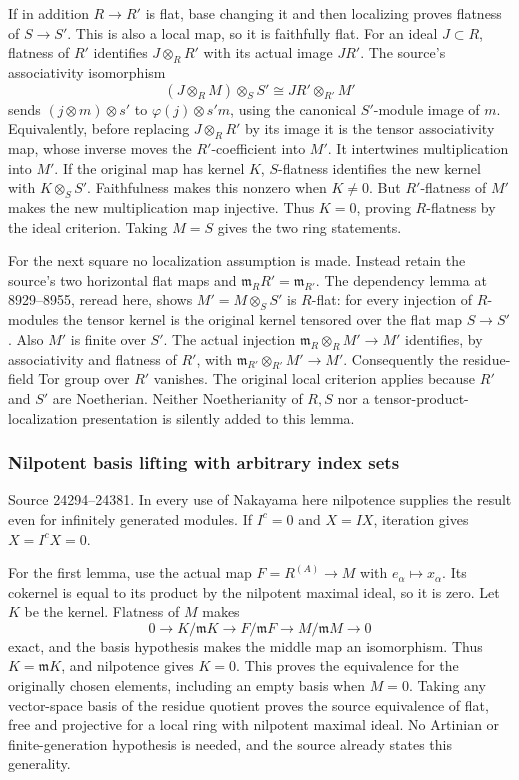 If in addition \(R\to R'\) is flat, base changing it and then localizing proves flatness of \(S\to S'\). This is also a local map, so it is faithfully flat. For an ideal \(J\subset R\), flatness of \(R'\) identifies \(J\otimes_RR'\) with its actual image \(JR'\). The source's associativity isomorphism \[
(J\otimes_RM)\otimes_SS'\cong JR'\otimes_{R'}M'
\] sends \((j\otimes m)\otimes s'\) to \(\varphi(j)\otimes s'm\), using the canonical \(S'\)-module image of \(m\). Equivalently, before replacing \(J\otimes_RR'\) by its image it is the tensor associativity map, whose inverse moves the \(R'\)-coefficient into \(M'\). It intertwines multiplication into \(M'\). If the original map has kernel \(K\), \(S\)-flatness identifies the new kernel with \(K\otimes_SS'\). Faithfulness makes this nonzero when \(K\ne0\). But \(R'\)-flatness of \(M'\) makes the new multiplication map injective. Thus \(K=0\), proving \(R\)-flatness by the ideal criterion. Taking \(M=S\) gives the two ring statements.

For the next square no localization assumption is made. Instead retain the source's two horizontal flat maps and \(\mathfrak m_RR'=\mathfrak m_{R'}\). The dependency lemma at 8929--8955, reread here, shows \(M'=M\otimes_SS'\) is \(R\)-flat: for every injection of \(R\)-modules the tensor kernel is the original kernel tensored over the flat map \(S\to S'\). Also \(M'\) is finite over \(S'\). The actual injection \(\mathfrak m_R\otimes_RM'\to M'\) identifies, by associativity and flatness of \(R'\), with \(\mathfrak m_{R'}\otimes_{R'}M'\to M'\). Consequently the residue-field Tor group over \(R'\) vanishes. The original local criterion applies because \(R'\) and \(S'\) are Noetherian. Neither Noetherianity of \(R,S\) nor a tensor-product-localization presentation is silently added to this lemma.

\subsubsection{Nilpotent basis lifting with arbitrary index sets}\label{nilpotent-basis-lifting-with-arbitrary-index-sets}

Source 24294--24381. In every use of Nakayama here nilpotence supplies the result even for infinitely generated modules. If \(I^c=0\) and \(X=IX\), iteration gives \(X=I^cX=0\).

For the first lemma, use the actual map \(F=R^{(A)}\to M\) with \(e_\alpha\mapsto x_\alpha\). Its cokernel is equal to its product by the nilpotent maximal ideal, so it is zero. Let \(K\) be the kernel. Flatness of \(M\) makes \[
0\to K/\mathfrak mK\to F/\mathfrak mF\to M/\mathfrak mM\to0
\] exact, and the basis hypothesis makes the middle map an isomorphism. Thus \(K=\mathfrak mK\), and nilpotence gives \(K=0\). This proves the equivalence for the originally chosen elements, including an empty basis when \(M=0\). Taking any vector-space basis of the residue quotient proves the source equivalence of flat, free and projective for a local ring with nilpotent maximal ideal. No Artinian or finite-generation hypothesis is needed, and the source already states this generality.

